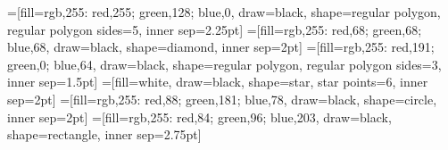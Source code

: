 \usepackage{pgfplots}
\pgfplotsset{%
    width=7cm,
    compat/show suggested version=false,
    compat=1.14
}
\usepackage{pgfplotstable}

\usetikzlibrary{positioning,decorations.pathmorphing,shapes,shapes.geometric}
=[fill={rgb,255: red,255; green,128; blue,0}, draw=black, shape=regular polygon, regular polygon sides=5, inner sep=2.25pt]
=[fill={rgb,255: red,68; green,68; blue,68}, draw=black, shape=diamond, inner sep=2pt]
=[fill={rgb,255: red,191; green,0; blue,64}, draw=black, shape=regular polygon, regular polygon sides=3, inner sep=1.5pt]
=[fill=white, draw=black, shape=star, star points=6, inner sep=2pt]
=[fill={rgb,255: red,88; green,181; blue,78}, draw=black, shape=circle, inner sep=2pt]
=[fill={rgb,255: red,84; green,96; blue,203}, draw=black, shape=rectangle, inner sep=2.75pt]
